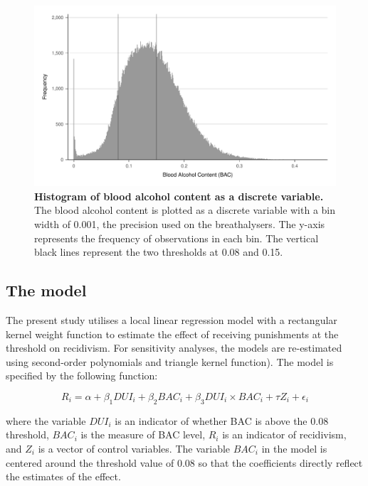 \documentclass[
  11pt,
]{article}
\begin{document}
\begin{figure}[h]
  \centering
  \includegraphics[width=0.9\columnwidth]{../figures/bac_histogram_discrete.pdf}
  \caption{\textbf{Histogram of blood alcohol content as a discrete variable.} The blood alcohol content is plotted as a discrete variable with a bin width of 0.001, the precision used on the breathalysers. The y-axis represents the frequency of observations in each bin. The vertical black lines represent the two thresholds at 0.08 and 0.15.}
  \label{fig:bac_hist_discrete}
\end{figure}

\hypertarget{the-model}{%
\subsection{The model}\label{the-model}}

The present study utilises a local linear regression model with a
rectangular kernel weight function to estimate the effect of receiving
punishments at the threshold on recidivism. For sensitivity analyses,
the models are re-estimated using second-order polynomials and triangle
kernel function). The model is specified by the following function:

\begin{equation}
  \label{eqn:model}
  R_i = \alpha + \beta_1 DUI_i + \beta_2 BAC_i + \beta_3 DUI_i \times BAC_i + \tau Z_i + \epsilon_i
\end{equation}

where the variable \(DUI_i\) is an indicator of whether BAC is above the
0.08 threshold, \(BAC_i\) is the measure of BAC level, \(R_i\) is an
indicator of recidivism, and \(Z_i\) is a vector of control variables.
The variable \(BAC_i\) in the model is centered around the threshold
value of 0.08 so that the coefficients directly reflect the estimates of
the effect.
\end{document}
